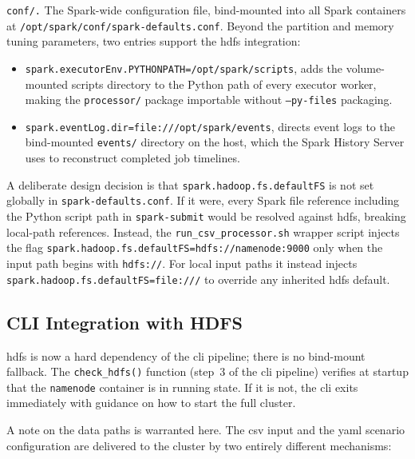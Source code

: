 \begin{sloppypar}
\texttt{conf/.}
The Spark-wide configuration file, bind-mounted into all Spark containers at
\texttt{/opt/spark/conf/\allowbreak{}spark-defaults.conf}.  Beyond the partition and memory tuning
parameters, two entries support the \gls{hdfs} integration:
\begin{itemize}
    \item \texttt{spark.executorEnv.\allowbreak{}PYTHONPATH=/opt/spark/scripts}, adds the volume-mounted
          scripts directory to the Python path of every executor worker, making the
          \texttt{processor/} package importable without \texttt{--py-files} packaging.
    \item \texttt{spark.eventLog.dir=\allowbreak{}file:///opt/spark/events}, directs event logs to the
          bind-mounted \texttt{events/} directory on the host, which the Spark History Server
          uses to reconstruct completed job timelines.
\end{itemize}

A deliberate design decision is that \texttt{spark.hadoop.fs.defaultFS} is not set
globally in \texttt{spark-defaults.conf}.  If it were, every Spark file reference including
the Python script path in \texttt{spark-submit} would be resolved against \gls{hdfs},
breaking local-path references.  Instead, the \texttt{run\_csv\_processor.sh} wrapper script
injects the flag \texttt{spark.hadoop\allowbreak.fs.defaultFS=\allowbreak hdfs://namenode:9000}
only when the input
path begins with \texttt{hdfs://}.  For local input paths it instead injects
\texttt{spark.hadoop.fs.defaultFS=\allowbreak file:///} to override any inherited \gls{hdfs} default.
\end{sloppypar}

\subsection{CLI Integration with HDFS}
\label{subsec:cap4-cli-integration-with-hdfs}

\gls{hdfs} is now a hard dependency of the \gls{cli} pipeline; there is no bind-mount
fallback.  The \texttt{check\_hdfs()} function (step~3 of the \gls{cli} pipeline) verifies
at startup that the \texttt{namenode} container is in running state.  If it is not, the
\gls{cli} exits immediately with guidance on how to start the full cluster.

A note on the data paths is warranted here.  The \gls{csv} input and the \gls{yaml} scenario
configuration are delivered to the cluster by two entirely different mechanisms:

